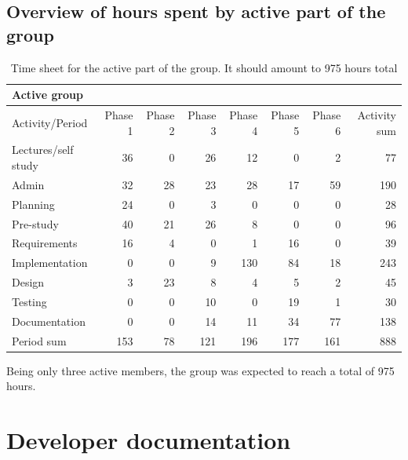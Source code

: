 \documentclass[11pt]{book}
\begin{document}
\section{Overview of hours spent by active part of the group}\label{sec:active_time_table}
\begin{table}[H]
\centering
\begin{tabular}{| l | r | r | r | r | r | r | r |}
    \hline
    Active group         &          &          &          &          &             &             &              \\ \hline                        
    Activity/Period     & Phase 1  & Phase 2  & Phase  3 & Phase 4  & Phase 5     & Phase 6     & Activity sum \\ \hline
    Lectures/self study & 36 & 0 & 26 & 12 & 0 & 2 & 77\\ \hline                        
    Admin & 32 & 28 & 23 & 28 & 17 & 59 & 190\\ \hline                        
    Planning & 24 & 0 & 3 & 0 & 0 & 0 & 28\\ \hline                        
    Pre-study & 40 & 21 & 26 & 8 & 0 & 0 & 96\\ \hline                        
    Requirements & 16 & 4 & 0 & 1 & 16 & 0 & 39\\ \hline                        
    Implementation & 0 & 0 & 9 & 130 & 84 & 18 & 243\\ \hline                        
    Design & 3 & 23 & 8 & 4 & 5 & 2 & 45\\ \hline                        
    Testing & 0 & 0 & 10 & 0 & 19 & 1 & 30\\ \hline                        
    Documentation & 0 & 0 & 14 & 11 & 34 & 77 & 138\\ \hline                        
    Period sum & 153 & 78 & 121 & 196 & 177 & 161 & 888\\ \hline                        
\end{tabular}
\caption{Time sheet for the active part of the group. It should amount to 975 hours total}
\label{tab:appendix_timesheets_active}
\end{table}

Being only three active members, the group was expected to reach a total of 975 hours.

\chapter{Developer documentation}\label{chap:documentation}
\end{document}
